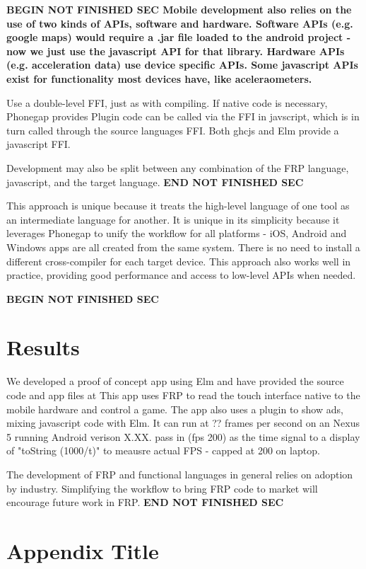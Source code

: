 \documentclass{sigplanconf}
\begin{document}
\bf{BEGIN NOT FINISHED SEC}
Mobile development also relies on the use of two kinds of APIs, software and hardware.
Software APIs (e.g. google maps) would require a .jar file loaded to the android project - now we just use the javascript API for that library.
Hardware APIs (e.g. acceleration data) use device specific APIs.
Some javascript APIs exist for functionality most devices have, like aceleraometers.

Use a double-level FFI, just as with compiling.
If native code is necessary, Phonegap provides %
Plugin code can be called via the FFI in javscript, which is in turn called through the source languages FFI.
Both ghcjs and Elm provide a javascript FFI. 

Development may also be split between any combination of the FRP language, javascript, and the target language.
\bf{END NOT FINISHED SEC}

This approach is unique because it treats the high-level language of one tool as an intermediate language for another. 
It is unique in its simplicity because it leverages Phonegap to unify the workflow for all platforms - iOS, Android and Windows apps are all created from the same system.
There is no need to install a different cross-compiler for each target device.
This approach also works well in practice, providing good performance and access to low-level APIs when needed.


\bf{BEGIN NOT FINISHED SEC}
\section{Results}
We developed a proof of concept app using Elm and have provided the source code and app files at %
This app uses FRP to read the touch interface native to the mobile hardware and control a game.
The app also uses a plugin to show ads, mixing javascript code with Elm.
It can run at ?? frames per second on an Nexus 5 running Android verison X.XX.
pass in (fps 200) as the time signal to a display of "toString (1000/t)" to meausre actual FPS - capped at 200 on laptop. 
 
The development of FRP and functional languages in general relies on adoption by industry.
Simplifying the workflow to bring FRP code to market will encourage future work in FRP.
\bf{END NOT FINISHED SEC}

\appendix
\section{Appendix Title}
\end{document}
